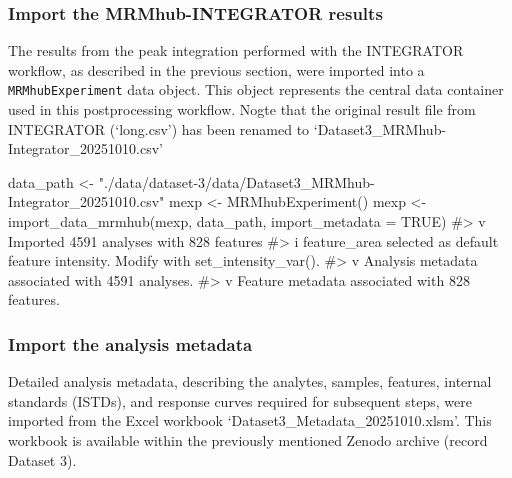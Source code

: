 \documentclass[
  letterpaper,
  DIV=11,
  numbers=noendperiod]{scrartcl}
\newenvironment{Shaded}{\begin{snugshade}}{\end{snugshade}}
\newcommand{\AttributeTok}[1]{\textcolor[rgb]{0.40,0.45,0.13}{#1}}
\newcommand{\CommentTok}[1]{\textcolor[rgb]{0.37,0.37,0.37}{#1}}
\newcommand{\ConstantTok}[1]{\textcolor[rgb]{0.56,0.35,0.01}{#1}}
\newcommand{\FunctionTok}[1]{\textcolor[rgb]{0.28,0.35,0.67}{#1}}
\newcommand{\NormalTok}[1]{\textcolor[rgb]{0.00,0.23,0.31}{#1}}
\newcommand{\OtherTok}[1]{\textcolor[rgb]{0.00,0.23,0.31}{#1}}
\newcommand{\StringTok}[1]{\textcolor[rgb]{0.13,0.47,0.30}{#1}}
\begin{document}
\subsubsection{Import the MRMhub-INTEGRATOR
results}\label{import-the-mrmhub-integrator-results}

The results from the peak integration performed with the INTEGRATOR
workflow, as described in the previous section, were imported into a
\texttt{MRMhubExperiment} data object. This object represents the
central data container used in this postprocessing workflow. Nogte that
the original result file from INTEGRATOR (`long.csv') has been renamed
to `Dataset3\_MRMhub-Integrator\_20251010.csv'

\begin{Shaded}
\begin{Highlighting}[]
\NormalTok{data\_path }\OtherTok{\textless{}{-}} \StringTok{"./data/dataset{-}3/data/Dataset3\_MRMhub{-}Integrator\_20251010.csv"}
\NormalTok{mexp }\OtherTok{\textless{}{-}} \FunctionTok{MRMhubExperiment}\NormalTok{()}
\NormalTok{mexp }\OtherTok{\textless{}{-}} \FunctionTok{import\_data\_mrmhub}\NormalTok{(mexp, data\_path, }\AttributeTok{import\_metadata =} \ConstantTok{TRUE}\NormalTok{)                        }
\CommentTok{\#\textgreater{} v Imported 4591 analyses with 828 features}
\CommentTok{\#\textgreater{} i \textasciigrave{}feature\_area\textasciigrave{} selected as default feature intensity. Modify with \textasciigrave{}set\_intensity\_var()\textasciigrave{}.}
\CommentTok{\#\textgreater{} v Analysis metadata associated with 4591 analyses.}
\CommentTok{\#\textgreater{} v Feature metadata associated with 828 features.}
\end{Highlighting}
\end{Shaded}

\subsubsection{Import the analysis
metadata}\label{import-the-analysis-metadata}

Detailed analysis metadata, describing the analytes, samples, features,
internal standards (ISTDs), and response curves required for subsequent
steps, were imported from the Excel workbook
`Dataset3\_Metadata\_20251010.xlsm'. This workbook is available within
the previously mentioned Zenodo archive (record Dataset 3).
\end{document}
